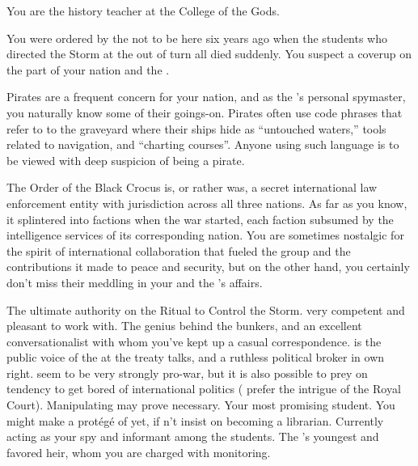 \documentclass[char]{GL2020}
\begin{document}
\begin{itemz}[Notes]
	\item You are the history teacher at the College of the Gods.
	\item You were ordered by the \cQueen{\Majesty} not to be here six years ago when the students who directed the Storm at the \pShippies{} out of turn all died suddenly. You suspect a coverup on the part of your nation and the \pTech{}.
	\item Pirates are a frequent concern for your nation, and as the \cQueen{\Majesty}'s personal spymaster, you naturally know some of their goings-on. Pirates often use code phrases that refer to to the graveyard where their ships hide as ``untouched waters,'' tools related to navigation, and ``charting courses''. Anyone using such language is to be viewed with deep suspicion of being a pirate.
	\item The Order of the Black Crocus is, or rather was, a secret international law enforcement entity with jurisdiction across all three nations. As far as you know, it splintered into factions when the war started, each faction subsumed by the intelligence services of its corresponding nation. You are sometimes nostalgic for the spirit of international collaboration that fueled the group and the contributions it made to peace and security, but on the other hand, you certainly don't miss their meddling in your and the \cQueen{\Majesty}'s affairs.
\end{itemz}

\begin{contacts}
	\contact{\cLibrarian{}} The ultimate authority on the Ritual to Control the Storm. \cLibrarian{\Theyare} very competent and pleasant to work with.
	\contact{\cBunker{}} The genius behind the bunkers, and an excellent conversationalist with whom you've kept up a casual correspondence.
	\contact{\cEvil{}} \cEvil{} is the public voice of the \cQueen{\Majesty} at the treaty talks, and a ruthless political broker in \cEvil{\their} own right. \cEvil{\They} seem to be very strongly pro-war, but it is also possible to prey on \cEvil{\their} tendency to get bored of international politics (\cEvil{\They} prefer the intrigue of the Royal Court). Manipulating \cEvil{\them} may prove necessary.
	\contact{\cLibAssist{}} Your most promising student. You might make a protégé of \cLibAssist{\them} yet, if \cLibAssist{\they} \cLibAssist{\does}n't insist on becoming a librarian. Currently acting as your spy and informant among the students.
	\contact{\cPrince{}} The \cQueen{\Majesty}'s youngest \cPrince{\child} and favored heir, whom you are charged with monitoring. 
\end{contacts}
\end{document}
